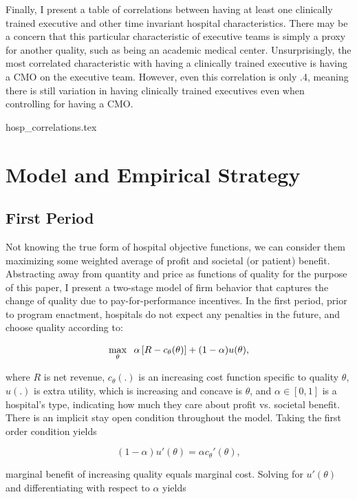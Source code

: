 \documentclass[12pt]{article}
\begin{document}
    Finally, I present a table of correlations between having at least one clinically trained executive and other time invariant hospital characteristics. There may be a concern that this particular characteristic of executive teams is simply a proxy for another quality, such as being an academic medical center. Unsurprisingly, the most correlated characteristic with having a clinically trained executive is having a CMO on the executive team. However, even this correlation is only .4, meaning there is still variation in having clinically trained executives even when controlling for having a CMO. 

    {hosp_correlations.tex}

    

    \section{Model and Empirical Strategy}\label{sec:model}

    \subsection{First Period}

    Not knowing the true form of hospital objective functions, we can consider them maximizing some weighted average of profit and societal (or patient) benefit. Abstracting away from quantity and price as functions of quality for the purpose of this paper, I present a two-stage model of firm behavior that captures the change of quality due to pay-for-performance incentives. In the first period, prior to program enactment, hospitals do not expect any penalties in the future, and choose quality according to:    
    
    $$\max_{\theta}\hspace{2mm}\alpha\left[R - c_{\theta}(\theta) \right] + (1-\alpha) u(\theta),$$

    \noindent where $R$ is net revenue, $c_{\theta}(.)$ is an increasing cost function specific to quality $\theta$, $u(.)$ is extra utility, which is increasing and concave is $\theta$, and $\alpha\in[0,1]$ is a hospital's type, indicating how much they care about profit vs. societal benefit. There is an implicit stay open condition throughout the model. Taking the first order condition yields 

    $$(1-\alpha)u'(\theta) = \alpha c_{\theta}'(\theta),$$

    \noindent marginal benefit of increasing quality equals marginal cost. Solving for $u'(\theta)$ and differentiating with respect to $\alpha$ yields
\end{document}
